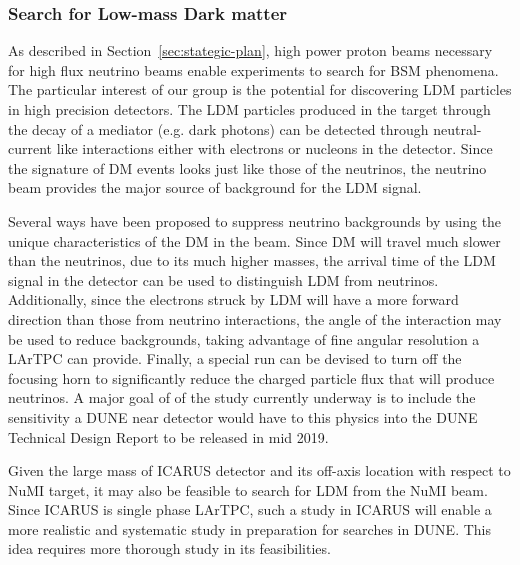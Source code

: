 \subsubsection*{Search for Low-mass Dark matter}
As described in Section~\ref{sec:stategic-plan}, high power proton beams necessary for high flux neutrino beams enable experiments to search for BSM phenomena.  The particular interest of our group is the potential for discovering LDM particles in high precision detectors. The LDM particles produced in the target through the decay of a mediator (e.g. dark photons) can be detected through neutral-current like interactions either with electrons or nucleons in the detector. Since the signature of DM events looks just like those of the neutrinos, the neutrino beam provides the major source of background for the LDM signal. 

Several ways have been proposed to suppress neutrino backgrounds by using the unique characteristics of the DM in the beam. Since DM will travel much slower than the neutrinos, due to its much higher masses, the arrival time of the LDM signal in the detector can be used to distinguish LDM from neutrinos.  Additionally, since the electrons struck by LDM will have a more forward direction than those from neutrino interactions, the angle of the interaction may be used to reduce backgrounds, taking advantage of fine angular resolution a LArTPC can provide. Finally, a special run can be devised to turn off the focusing horn to significantly reduce the charged particle flux that will produce neutrinos. A major goal of of the study currently underway is to include the sensitivity a DUNE near detector would have to this physics into the DUNE Technical Design Report to be released in mid 2019.

Given the large mass of ICARUS detector and its off-axis location with respect to NuMI target, it may also be feasible to search for LDM from the NuMI beam.  Since ICARUS is single phase LArTPC, such a study in ICARUS will enable a more realistic and systematic study in preparation for searches in DUNE.  This idea requires more thorough study in its feasibilities.

